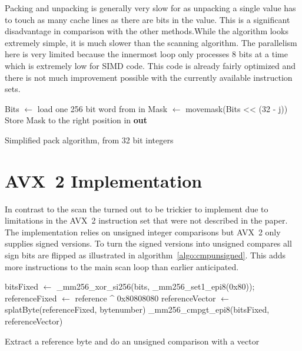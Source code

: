 Packing and unpacking is generally very slow for \bwv{} as unpacking a single
value has to touch as many cache lines as there are bits in the value. This is a
significant disadvantage in comparison with the other methods.While the
algorithm looks extremely simple, it is much slower than the scanning algorithm.
The parallelism here is very limited because the innermost loop only processes 8
bits at a time which is extremely low for SIMD code. This code is already fairly
optimized and there is not much improvement possible with the currently
available instruction sets.

\begin{algorithm}[h]
\begin{algorithmic}[1]
      \State Bits $\gets$ load one 256 bit word from in
        \State Mask $\gets$ movemask(Bits << (32 - j)) 
        \State Store Mask to the right position in \textbf{out}
      \EndFor
    \EndFor
  \EndFor
  \EndProcedure
\end{algorithmic}
\caption{Simplified \bwv{} pack algorithm, from 32 bit integers}
\label{algo:packbwv}
\end{algorithm}

\section{AVX~2 \bs{} Implementation}

In contrast to the \bwv{} scan the \bs{} turned out to be trickier to implement
due to limitations in the AVX~2 instruction set that were not described in the
\bs{} paper. The implementation relies on unsigned integer comparisons but AVX~2
only supplies signed versions. To turn the signed versions into unsigned
compares all sign bits are flipped as illustrated in
algorithm~\ref{algo:cmpunsigned}. This adds more instructions to the main scan
loop than earlier anticipated.

\begin{algorithm}[h]
\begin{algorithmic}[1]
  \State bitsFixed $\gets$ \_mm256\_xor\_si256(bits, \_mm256\_set1\_epi8(0x80));
  \State referenceFixed $\gets$ reference \^{} 0x80808080
  \State referenceVector $\gets$ splatByte(referenceFixed, bytenumber)
  \State \Return \_mm256\_cmpgt\_epi8(bitsFixed, referenceVector)
  \EndProcedure
\end{algorithmic}
\caption{Extract a reference byte and do an unsigned comparison with a vector}
\label{algo:cmpunsigned}
\end{algorithm}

